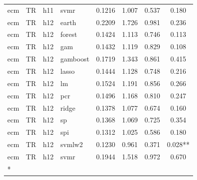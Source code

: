 \begin{ThreePartTable}
\begin{longtable}[t]{llclcccc}
ecm & TR & h11 & svmr & 0.1216 & 1.007 & 0.537 & 0.180\\
\addlinespace
ecm & TR & h12 & earth & 0.2209 & 1.726 & 0.981 & 0.236\\
ecm & TR & h12 & forest & 0.1424 & 1.113 & 0.746 & 0.113\\
ecm & TR & h12 & gam & 0.1432 & 1.119 & 0.829 & 0.108\\
ecm & TR & h12 & gamboost & 0.1719 & 1.343 & 0.861 & 0.415\\
ecm & TR & h12 & lasso & 0.1444 & 1.128 & 0.748 & 0.216\\
ecm & TR & h12 & lm & 0.1524 & 1.191 & 0.856 & 0.266\\
ecm & TR & h12 & pcr & 0.1496 & 1.168 & 0.810 & 0.247\\
ecm & TR & h12 & ridge & 0.1378 & 1.077 & 0.674 & 0.160\\
ecm & TR & h12 & sp & 0.1368 & 1.069 & 0.725 & 0.354\\
ecm & TR & h12 & spi & 0.1312 & 1.025 & 0.586 & 0.180\\
ecm & TR & h12 & svmlw2 & 0.1230 & 0.961 & 0.371 & 0.028**\\
ecm & TR & h12 & svmr & 0.1944 & 1.518 & 0.972 & 0.670\\*
\end{longtable}
\end{ThreePartTable}
\endgroup{}
